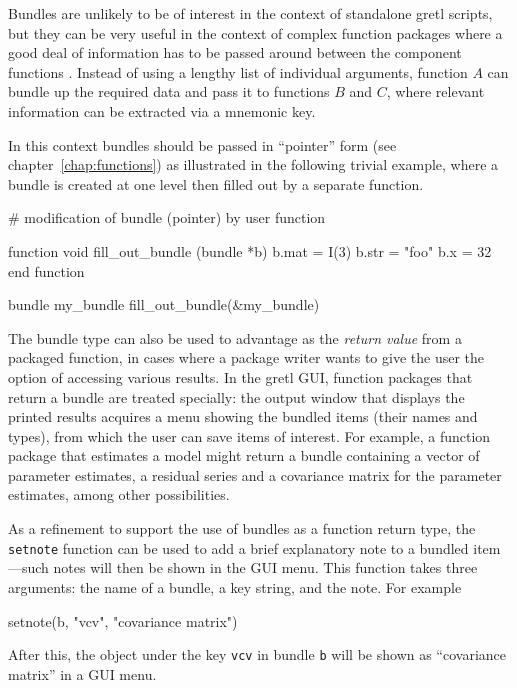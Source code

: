Bundles are unlikely to be of interest in the context of standalone
gretl scripts, but they can be very useful in the context of complex
function packages where a good deal of information has to be passed
around between the component functions \citep[see][]{GFPG}. Instead of
using a lengthy list of individual arguments, function $A$ can bundle
up the required data and pass it to functions $B$ and $C$, where
relevant information can be extracted via a mnemonic key.

In this context bundles should be passed in ``pointer'' form
(see chapter~\ref{chap:functions}) as illustrated in the following
trivial example, where a bundle is created at one level then filled
out by a separate function.

\begin{code}
# modification of bundle (pointer) by user function

function void fill_out_bundle (bundle *b)
  b.mat =  I(3)
  b.str = "foo"
  b.x = 32
end function

bundle my_bundle 
fill_out_bundle(&my_bundle)
\end{code}

The bundle type can also be used to advantage as the \textit{return
  value} from a packaged function, in cases where a package writer
wants to give the user the option of accessing various results. In the
gretl GUI, function packages that return a bundle are treated
specially: the output window that displays the printed results
acquires a menu showing the bundled items (their names and types),
from which the user can save items of interest. For example, a
function package that estimates a model might return a bundle 
containing a vector of parameter estimates, a residual series and a
covariance matrix for the parameter estimates, among other
possibilities.

As a refinement to support the use of bundles as a function return
type, the \texttt{setnote} function can be used to add a brief
explanatory note to a bundled item---such notes will then be shown in
the GUI menu.  This function takes three arguments: the name of a
bundle, a key string, and the note. For example

\begin{code}
setnote(b, "vcv", "covariance matrix")
\end{code}

After this, the object under the key \texttt{vcv} in bundle \texttt{b}
will be shown as ``covariance matrix'' in a GUI menu.

